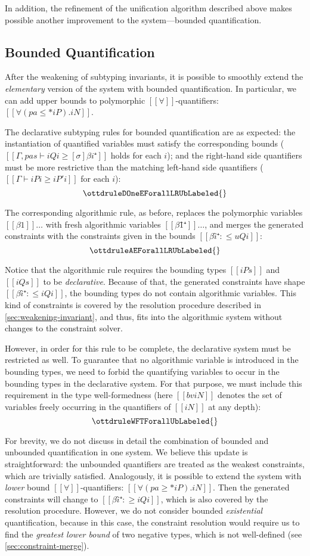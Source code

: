 In addition, the refinement of the unification algorithm described above
makes possible another improvement to the system---bounded quantification.

\subsection{Bounded Quantification}

After the weakening of subtyping invariants, 
it is possible to smoothly extend the \emph{elementary}
version of the system with bounded quantification.
In particular, we can add upper bounds to polymorphic $[[∀]]$-quantifiers:
$[[∀(pa ≤* iP). iN]]$. 

The declarative subtyping rules for bounded quantification are as expected:
the instantiation of quantified variables must satisfy the corresponding bounds
($[[Γ, pas ⊢ iQi ≥ [σ]βi⁺]]$ holds for each $i$);
and the right-hand side quantifiers must be more restrictive than the matching left-hand side
quantifiers ($[[Γ ⊢ iPi ≥ iP'i]]$ for each $i$):
$$\ottdruleDOneEForallLRUbLabeled{}$$

The corresponding algorithmic rule, as before,
replaces the polymorphic variables $[[β1]]\dots$ with fresh 
algorithmic variables $[[β1̂⁺]]\dots$, and merges the generated
constraints with the constraints given in the bounds
$[[βî⁺ :≤ uQi]]$:
$$\ottdruleAEForallLRUbLabeled{}$$

Notice that the algorithmic rule 
requires the bounding types $[[iPs]]$ and $[[iQs]]$ to be \emph{declarative}.
Because of that, the generated constraints have shape $[[βî⁺ :≤ iQi]]$,
\ie the bounding types do not contain algorithmic variables.
This kind of constraints is covered by the resolution procedure described in
\cref{sec:weakening-invariant}, and thus,  fits 
into the algorithmic system without changes to the constraint solver.

However, in order for this rule to be complete, 
the declarative system must be restricted as well.
To guarantee that no algorithmic variable is introduced in the bounding types,
we need to forbid the quantifying variables to occur in the bounding types in the declarative system.
For that purpose, we must include this requirement in the type well-formedness
(here $[[bv iN]]$ denotes the set of variables freely occurring 
in the quantifiers of $[[iN]]$ at any depth):
$$\ottdruleWFTForallUbLabeled{}$$

For brevity, we do not discuss in detail the combination of bounded and
unbounded quantification in one system. We believe this update is straightforward:
the unbounded quantifiers are treated as the weakest constraints, which are trivially
satisfied. Analogously, it is possible to extend the system with \emph{lower}
bound $[[∀]]$-quantifiers: $[[∀(pa ≥* iP). iN]]$. 
Then the generated constraints will change to $[[βî⁺ :≥ iQi]]$, which 
is also covered by the resolution procedure.
However, we do not consider bounded \emph{existential} quantification,
because in this case, the constraint resolution would require us to 
find the \emph{greatest lower bound} of two negative types, which is not
well-defined (see \cref{sec:constraint-merge}).

